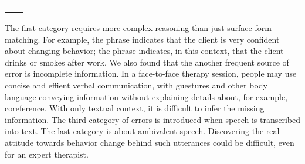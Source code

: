 \begin{table}[!h]
\begin{center}
\begin{tabular}{ll}
& \\                                                                                                                                                                                                                                                             &                                                                                                                             \\\bottomrule
\end{tabular}
\end{center}
\label{tbl:c_client_errors}
\end{table}

The first category requires more complex reasoning than just surface
form matching. For example, the phrase 
indicates that the client is very confident about changing behavior;
the phrase  indicates, in this context,
that the client drinks or smokes after work. We also found that the
another frequent source of error is incomplete information. In a
face-to-face therapy session, people may use concise and effient
verbal communication, with guestures and other body language conveying
information without explaining details about, for example,
coreference.  With only textual context, it is difficult to infer the
missing information. The third category of errors is introduced when
speech is transcribed into text. The last category is about ambivalent
speech. Discovering the real attitude towards behavior change behind
such utterances could be difficult, even for an expert therapist.
